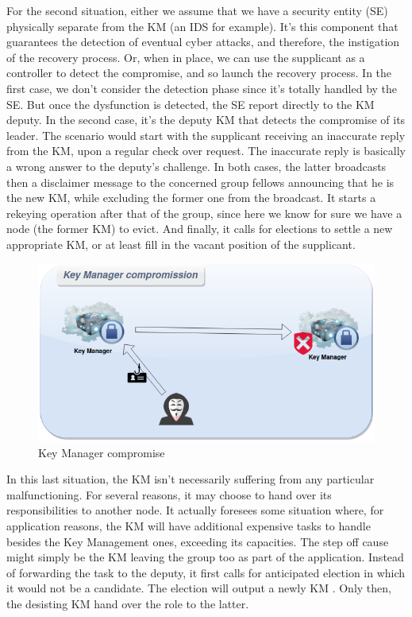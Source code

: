 For the second situation, either we assume that we have a security entity (SE) physically separate from the KM (an IDS for example). It’s this component that guarantees the detection of eventual cyber attacks, and therefore, the instigation of the recovery process. Or, when in place, we can use the supplicant as a controller to detect the compromise, and so launch the recovery process. In the first case, we don’t consider the detection phase since it’s totally handled by the SE. But once the dysfunction is detected, the SE report directly to the KM deputy. In the second case, it’s the deputy KM that detects the compromise of its leader. The scenario would start with the supplicant receiving an inaccurate reply from the KM, upon a regular check over request. The inaccurate reply is basically a wrong answer to the deputy’s challenge. In both cases, the latter broadcasts then a disclaimer message to the concerned group fellows announcing that he is the new KM, while excluding the former one from the broadcast. It starts a rekeying operation after that of the group, since here we know for sure we have a node (the former KM) to evict. And finally, it calls for elections to settle a new appropriate KM, or at least fill in the vacant position of the supplicant.

\begin{figure}[htbp]
	\centerline{\includegraphics[scale=0.50]{figures/compromission.png}}
	\caption{Key Manager compromise}
	\label{fig:km_compromission}
\end{figure}

In this last situation, the KM isn’t necessarily suffering from any particular malfunctioning. For several reasons, it may choose to hand over its responsibilities to another node. It actually foresees some situation where, for application reasons, the KM will have additional expensive tasks to handle besides the Key Management ones, exceeding its capacities. The step off cause might simply be the KM leaving the group too as part of the application. Instead of forwarding the task to the deputy, it first calls for anticipated election in which it would not be a candidate. The election will output a newly KM . Only then, the desisting KM hand over the role to the latter.
%

